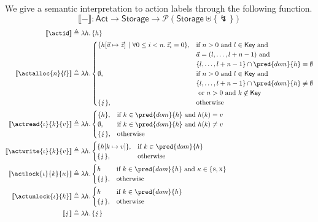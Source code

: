 We give a semantic interpretation to action labels through the following function.
\[
\llbracket - \rrbracket : \mathsf{Act} \rightarrow \mathsf{Storage} \rightarrow \mathcal{P}(\mathsf{Storage} \uplus \{ \lightning \})
\]
\begin{align*}
\llbracket \actid \rrbracket &\triangleq \lambda h \ldotp \{h\} \\
\llbracket \actalloc{n}{l} \rrbracket &\triangleq \lambda h \ldotp
\begin{cases}
\{ h[\vec{a} \mapsto \vec{z}]\ |\ \forall 0 \leq i < n \ldotp \vec{z}_i = 0 \},
&
\text{if } n > 0 \text{ and } l \in \mathsf{Key} \text{ and } \\
& \vec{a} = (l, \ldots, l + n - 1) \text{ and } \\
& \{ l, \ldots, l + n - 1 \} \cap \pred{dom}{h} \equiv \emptyset \\
\emptyset, & \text{if } n > 0 \text{ and } l \in \mathsf{Key} \text{ and } \\
& \{ l, \ldots, l + n - 1 \} \cap \pred{dom}{h} \not\equiv \emptyset \\
& \text{ or } n > 0 \text{ and } k \not\in \mathsf{Key} \\
\{ \lightning \}, & \text{otherwise}
\end{cases} \\
\llbracket \actread{\iota}{k}{v} \rrbracket &\triangleq \lambda h \ldotp
\begin{cases}
\{ h \}, & \text{if } k \in \pred{dom}{h} \text{ and } h(k) = v \\
\emptyset, & \text{if } k \in \pred{dom}{h} \text{ and } h(k) \neq v \\
\{ \lightning \}, & \text{otherwise}
\end{cases} \\
\llbracket \actwrite{\iota}{k}{v} \rrbracket &\triangleq \lambda h \ldotp
\begin{cases}
\{ h[k \mapsto v] \}, & \text{if } k \in \pred{dom}{h} \\
\{ \lightning \}, & \text{otherwise}
\end{cases} \\
\llbracket \actlock{\iota}{k}{\kappa} \rrbracket &\triangleq \lambda h \ldotp
\begin{cases}
h & \text{if } k \in \pred{dom}{h} \text{ and } \kappa \in \{ \textsc{s}, \textsc{x} \} \\
\{ \lightning \}, & \text{otherwise}
\end{cases} \\
\llbracket \actunlock{\iota}{k} \rrbracket &\triangleq \lambda h \ldotp
\begin{cases}
h & \text{if } k \in \pred{dom}{h} \\
\{ \lightning \}, & \text{otherwise}
\end{cases} \\
\llbracket \lightning \rrbracket &\triangleq \lambda h \ldotp \{ \lightning \}
\end{align*}

